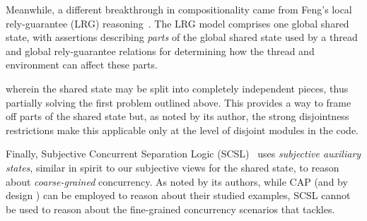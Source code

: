Meanwhile, a different breakthrough  in compositionality  came from
Feng's local rely-guarantee (LRG)  reasoning~\cite{lrg}. The LRG model
comprises  one global shared state,
with assertions describing {\em parts} of the global shared state used by a
thread and  global rely-guarantee
relations for determining how the thread and environment can affect
these parts. 


wherein the shared state may be
split into completely independent pieces, thus partially solving the
first problem outlined above. This provides a way to frame off parts
of the shared state but, as noted by its author, the strong
disjointness restrictions make this applicable only at the level of
disjoint modules in the code. 





Finally, Subjective Concurrent Separation Logic (SCSL)~\cite{SCSL}
uses \emph{subjective auxiliary states}, similar in spirit to our
subjective views for the shared state, to reason about \emph{coarse-grained}
concurrency. As noted by its authors, while CAP (and by design \colosl) can
be employed to reason about their studied examples, SCSL cannot be
used to reason about the fine-grained concurrency scenarios that \colosl tackles.


